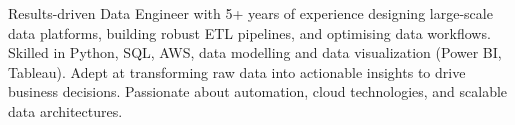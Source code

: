 

\begin{cvparagraph}

 Results-driven Data Engineer with 5+ years of experience designing large-scale data platforms, building robust ETL pipelines, and optimising data workflows. Skilled in Python, SQL, AWS, data modelling and data visualization (Power BI, Tableau). Adept at transforming raw data into actionable insights to drive business decisions. Passionate about automation, cloud technologies, and scalable data architectures.
\end{cvparagraph}
